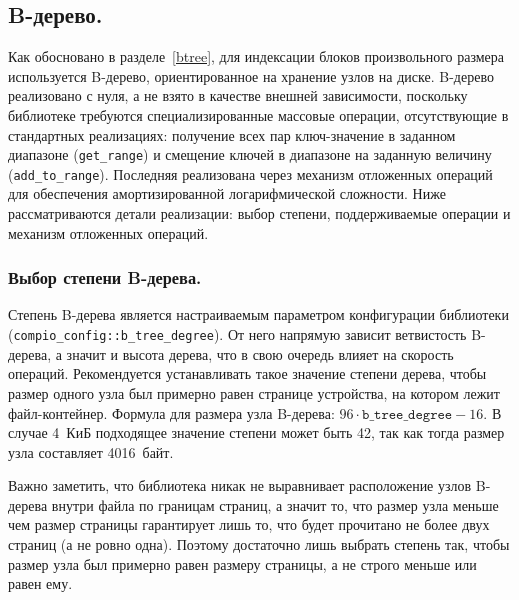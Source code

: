 
\subsection{B-дерево.}

Как обосновано в разделе~\ref{btree}, для индексации блоков произвольного размера используется B-дерево, ориентированное на хранение узлов на диске. B-дерево реализовано с нуля, а не взято в качестве внешней зависимости, поскольку библиотеке требуются специализированные массовые операции, отсутствующие в стандартных реализациях: получение всех пар ключ-значение в заданном диапазоне (\texttt{get\_range}) и смещение ключей в диапазоне на заданную величину (\texttt{add\_to\_range}). Последняя реализована через механизм отложенных операций для обеспечения амортизированной логарифмической сложности. Ниже рассматриваются детали реализации: выбор степени, поддерживаемые операции и механизм отложенных операций.

\subsubsection{Выбор степени B-дерева.}
Степень B-дерева является настраиваемым параметром конфигурации библиотеки (\texttt{compio\_config::b\_tree\_degree}). От него напрямую зависит ветвистость B-дерева, а значит и высота дерева, что в свою очередь влияет на скорость операций. Рекомендуется устанавливать такое значение степени дерева, чтобы размер одного узла был примерно равен странице устройства, на котором лежит файл-контейнер. Формула для размера узла B-дерева: \mbox{$96 \cdot \texttt{b\_tree\_degree} - 16$}. В случае 4~КиБ подходящее значение степени может быть 42, так как тогда размер узла составляет 4016~байт.

Важно заметить, что библиотека никак не выравнивает расположение узлов B-дерева внутри файла по границам страниц, а значит то, что размер узла меньше чем размер страницы гарантирует лишь то, что будет прочитано не более двух страниц (а не ровно одна). Поэтому достаточно лишь выбрать степень так, чтобы размер узла был примерно равен размеру страницы, а не строго меньше или равен ему.

